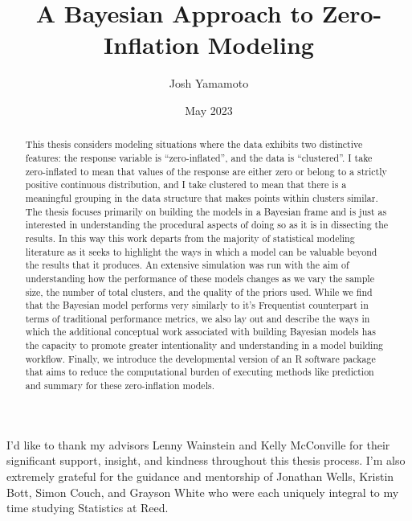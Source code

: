 \documentclass[12pt,twoside]{reedthesis}
\title{A Bayesian Approach to Zero-Inflation Modeling}
\author{Josh Yamamoto}
\date{May 2023}
\begin{document}
  \maketitle

\frontmatter %
\pagestyle{empty} %
  \begin{acknowledgements}
    I'd like to thank my advisors Lenny Wainstein and Kelly McConville for their significant support, insight, and kindness throughout this thesis process. I'm also extremely grateful for the guidance and mentorship of Jonathan Wells, Kristin Bott, Simon Couch, and Grayson White who were each uniquely integral to my time studying Statistics at Reed.
  \end{acknowledgements}


  \hypersetup{linkcolor=black}
  \setcounter{secnumdepth}{2}
  \setcounter{tocdepth}{2}
  \tableofcontents

  \listoffigures
  \begin{abstract}
    This thesis considers modeling situations where the data exhibits two distinctive features: the response variable is ``zero-inflated'', and the data is ``clustered''. I take zero-inflated to mean that values of the response are either zero or belong to a strictly positive continuous distribution, and I take clustered to mean that there is a meaningful grouping in the data structure that makes points within clusters similar. The thesis focuses primarily on building the models in a Bayesian frame and is just as interested in understanding the procedural aspects of doing so as it is in dissecting the results. In this way this work departs from the majority of statistical modeling literature as it seeks to highlight the ways in which a model can be valuable beyond the results that it produces. An extensive simulation was run with the aim of understanding how the performance of these models changes as we vary the sample size, the number of total clusters, and the quality of the priors used. While we find that the Bayesian model performs very similarly to it's Frequentist counterpart in terms of traditional performance metrics, we also lay out and describe the ways in which the additional conceptual work associated with building Bayesian models has the capacity to promote greater intentionality and understanding in a model building workflow. Finally, we introduce the developmental version of an R software package that aims to reduce the computational burden of executing methods like prediction and summary for these zero-inflation models.
  \end{abstract}
\end{document}
